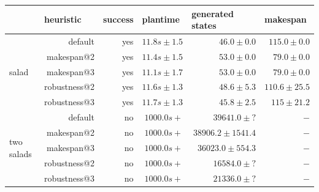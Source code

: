 \begin{table}[]
  \centering
  \begin{tabular}{p{1.5cm}rrrrr}
  \multicolumn{1}{l}{}         & \multicolumn{1}{l}{heuristic} & success & \multicolumn{1}{l}{plantime} & \multicolumn{1}{l}{generated states} & \multicolumn{1}{l}{makespan} \\ \hline \hline
  \multirow{5}{*}{salad}        & default                       & yes     & $11.8s\pm1.5 $              & $46.0\pm0.0$                         & $115.0 \pm0.0$               \\ 
                                & makespan@2                    & yes     & $11.4s\pm1.5 $              & $53.0\pm0.0$                         & $79.0  \pm0.0$               \\ 
                                & makespan@3                    & yes     & $11.1s\pm1.7 $              & $53.0\pm0.0$                         & $79.0  \pm0.0$               \\
                                & robustness@2                  & yes     & $11.6s\pm1.3 $              & $48.6\pm5.3$                         & $110.6 \pm25.5$               \\ 
                                & robustness@3                  & yes     & $11.7s\pm1.3 $              & $45.8\pm2.5$                         & $115 \pm21.2$               \\\hline
  \multirow{5}{*}{\parbox{1.2cm}{two salads}}   
                                & default                       & no      & $1000.0s+$                  & $39641.0\pm?$                        & $-     $                     \\
                                & makespan@2                    & no      & $1000.0s+$                  & $38906.2\pm1541.4$                   & $-     $                     \\
                                & makespan@3                    & no      & $1000.0s+$                  & $36023.0\pm554.3$                    & $-     $                     \\
                                & robustness@2                  & no      & $1000.0s+$                  & $16584.0\pm?$                        & $-     $                     \\ 
                                & robustness@3                  & no      & $1000.0s+$                  & $21336.0\pm?$                        & $-     $                     \\\hline

\end{tabular}
\end{table}
